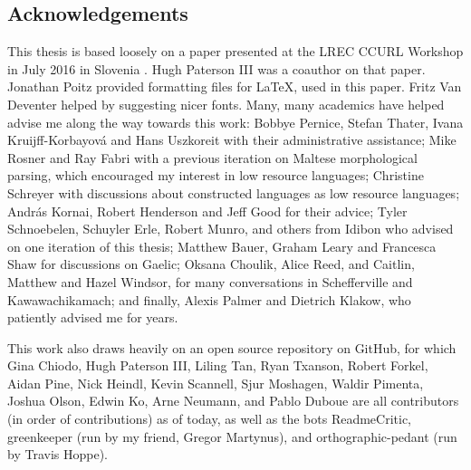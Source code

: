\newpage
\noindent\subsection*{Acknowledgements}

This thesis is based loosely on a paper presented at the LREC CCURL Workshop in July 2016 in Slovenia \citep{CCURL}. Hugh Paterson III was a coauthor on that paper. Jonathan Poitz provided formatting files for \LaTeX, used in this paper. Fritz Van Deventer helped by suggesting nicer fonts. Many, many academics have helped advise me along the way towards this work: Bobbye Pernice, Stefan Thater, Ivana Kruijff-Korbayov\'a and Hans Uszkoreit with their administrative assistance; Mike Rosner and Ray Fabri with a previous iteration on Maltese morphological parsing, which encouraged my interest in low resource languages; Christine Schreyer with discussions about constructed languages as low resource languages; Andr\'{a}s Kornai, Robert Henderson and Jeff Good for their advice; Tyler Schnoebelen, Schuyler Erle, Robert Munro, and others from Idibon who advised on one iteration of this thesis; Matthew Bauer, Graham Leary and Francesca Shaw for discussions on Gaelic; Oksana Choulik, Alice Reed, and Caitlin, Matthew and Hazel Windsor, for many conversations in Schefferville and Kawawachikamach; and finally, Alexis Palmer and Dietrich Klakow, who patiently advised me for years.

This work also draws heavily on an open source repository on GitHub, for which Gina Chiodo, Hugh Paterson III, Liling Tan, Ryan Txanson, Robert Forkel, Aidan Pine, Nick Heindl, Kevin Scannell, Sjur Moshagen, Waldir Pimenta, Joshua Olson, Edwin Ko, Arne Neumann, and Pablo Duboue are all contributors (in order of contributions) as of today, as well as the bots ReadmeCritic, greenkeeper (run by my friend, Gregor Martynus), and orthographic-pedant (run by Travis Hoppe).

